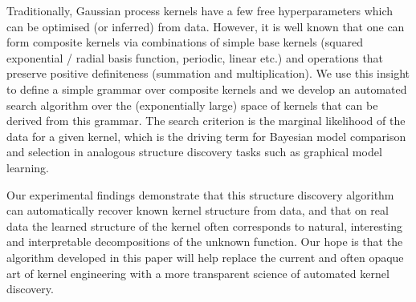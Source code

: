 \documentclass[twoside]{article}
\begin{document}
Traditionally, Gaussian process kernels have a few free hyperparameters which can be optimised (or inferred) from data.
However, it is well known that one can form composite kernels via combinations of simple base kernels (\eg squared exponential / radial basis function, periodic, linear etc.) and operations that preserve positive definiteness (\eg summation and multiplication).
We use this insight to define a simple grammar over composite kernels and we develop an automated search algorithm over the (exponentially large) space of kernels that can be derived from this grammar.
The search criterion is the marginal likelihood of the data for a given kernel, which is the driving term for Bayesian model comparison and selection in analogous structure discovery tasks such as graphical model learning.

Our experimental findings demonstrate that this structure discovery algorithm can automatically recover known kernel structure from data, and that on real data the learned structure of the kernel often corresponds to natural, interesting and interpretable decompositions of the unknown function.
Our hope is that the algorithm developed in this paper will help replace the current and often opaque art of kernel engineering with a more transparent science of automated kernel discovery.



\end{document}
